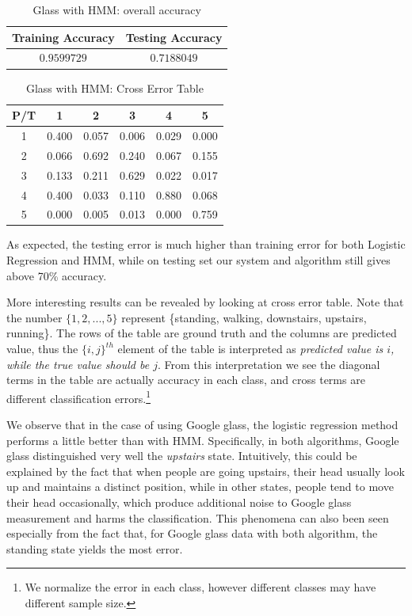 \begin{itemize}
\begin{table}[!htb]
\begin{center}
\begin{tabular}{c|c}
      \hline
      Training Accuracy & Testing Accuracy\\
      \hline
      $0.9599729$ & $0.7188049$ \\
      \hline
\end{tabular}
\caption{Glass with HMM: overall accuracy}
\label{tab:glassHMM1}
\end{center}
\end{table}
\begin{table}[h]
\begin{center}
\begin{tabular}{c|c|c|c|c|c}
      \hline
      P/T& 1 & 2 &3 & 4 & 5 \\
      \hline
      1 &0.400&0.057&0.006&0.029&0.000\\
      2 &0.066&0.692&0.240&0.067&0.155\\
      3 &0.133&0.211&0.629&0.022&0.017\\
      4 &0.400&0.033&0.110&0.880&0.068\\
      5 & 0.000&0.005&0.013&0.000&0.759\\
      \hline
\end{tabular}
\caption{Glass with HMM: Cross Error Table}
\label{tab:glassHMM2}
\end{center}
\end{table}
\end{itemize}

As expected, the testing error is much higher than training error for both Logistic Regression and HMM, while on testing set our system and algorithm still gives above 70\% accuracy. 

More interesting results can be revealed by looking at cross error table. Note that the number $\{1,2,...,5\}$ represent \{standing, walking, downstairs, upstairs, running\}. The rows of the table are ground truth and the columns are predicted value, thus the $\{i,j\}^{th}$ element of the table is interpreted as \textit{predicted value is $i$, while the true value should be $j$}. From this interpretation we see the diagonal terms in the table are actually accuracy in each class, and cross terms are different classification errors.\footnote{We normalize the error in each class, however different classes may have different sample size.}

We observe that in the case of using Google glass, the logistic regression method performs a little better than with HMM. Specifically, in both algorithms, Google glass distinguished very well the \textit{upstairs} state. Intuitively, this could be explained by the fact that when people are going upstairs, their head usually look up and maintains a distinct position, while in other states, people tend to move their head occasionally, which produce additional noise to Google glass measurement and harms the classification. This phenomena can also been seen especially from the fact that, for Google glass data with both algorithm, the standing state yields the most error.

